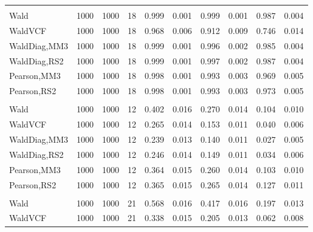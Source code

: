 \documentclass[
]{article}
\begin{document}
\begin{table}[H]
{\begin{tabular}[t]{lrrrrrrlrr}
\addlinespace[0.3em]
\multicolumn{10}{l}{\textbf{1F 15V}}\\
\hspace{1em}Wald & 1000 & 1000 & 18 & 0.999 & 0.001 & 0.999 & 0.001 & 0.987 & 0.004\\
\hspace{1em}WaldVCF & 1000 & 1000 & 18 & 0.968 & 0.006 & 0.912 & 0.009 & 0.746 & 0.014\\
\hspace{1em}WaldDiag,MM3 & 1000 & 1000 & 18 & 0.999 & 0.001 & 0.996 & 0.002 & 0.985 & 0.004\\
\hspace{1em}WaldDiag,RS2 & 1000 & 1000 & 18 & 0.999 & 0.001 & 0.997 & 0.002 & 0.987 & 0.004\\
\hspace{1em}Pearson,MM3 & 1000 & 1000 & 18 & 0.998 & 0.001 & 0.993 & 0.003 & 0.969 & 0.005\\
\hspace{1em}Pearson,RS2 & 1000 & 1000 & 18 & 0.998 & 0.001 & 0.993 & 0.003 & 0.973 & 0.005\\
\addlinespace[0.3em]
\multicolumn{10}{l}{\textbf{2F 10V}}\\
\hspace{1em}Wald & 1000 & 1000 & 12 & 0.402 & 0.016 & 0.270 & 0.014 & 0.104 & 0.010\\
\hspace{1em}WaldVCF & 1000 & 1000 & 12 & 0.265 & 0.014 & 0.153 & 0.011 & 0.040 & 0.006\\
\hspace{1em}WaldDiag,MM3 & 1000 & 1000 & 12 & 0.239 & 0.013 & 0.140 & 0.011 & 0.027 & 0.005\\
\hspace{1em}WaldDiag,RS2 & 1000 & 1000 & 12 & 0.246 & 0.014 & 0.149 & 0.011 & 0.034 & 0.006\\
\hspace{1em}Pearson,MM3 & 1000 & 1000 & 12 & 0.364 & 0.015 & 0.260 & 0.014 & 0.103 & 0.010\\
\hspace{1em}Pearson,RS2 & 1000 & 1000 & 12 & 0.365 & 0.015 & 0.265 & 0.014 & 0.127 & 0.011\\
\addlinespace[0.3em]
\multicolumn{10}{l}{\textbf{3F 15V}}\\
\hspace{1em}Wald & 1000 & 1000 & 21 & 0.568 & 0.016 & 0.417 & 0.016 & 0.197 & 0.013\\
\hspace{1em}WaldVCF & 1000 & 1000 & 21 & 0.338 & 0.015 & 0.205 & 0.013 & 0.062 & 0.008\\

\end{tabular}}
\end{table}
\end{document}
